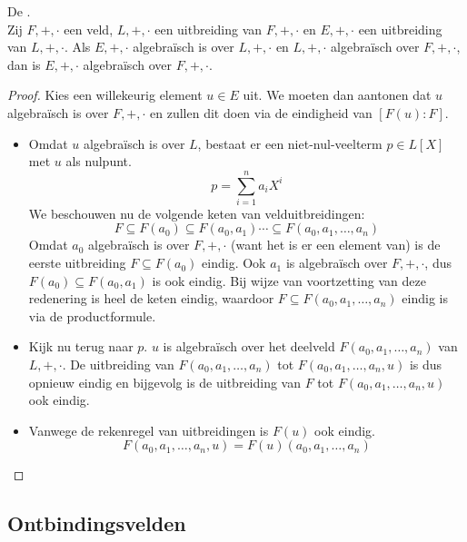 \documentclass[main.tex]{subfiles}
\begin{document}
\begin{st}
  \examen
  \label{st:transitiviteit-algebraisch-zijn}
  De .\\
  Zij $F,+,\cdot$ een veld, $L,+,\cdot$ een uitbreiding van $F,+,\cdot$ en $E,+,\cdot$ een uitbreiding van $L,+,\cdot$.
  Als $E,+,\cdot$ algebra\"isch is over $L,+,\cdot$ en $L,+,\cdot$ algebra\"isch over $F,+,\cdot$, dan is $E,+,\cdot$ algebra\"isch over $F,+,\cdot$.

  \begin{proof}
    Kies een willekeurig element $u\in E$ uit.
    We moeten dan aantonen dat $u$ algebra\"isch is over $F,+,\cdot$ en zullen dit doen via de eindigheid van $[F(u):F]$.
    \begin{itemize}
    \item Omdat $u$ algebra\"isch is over $L$, bestaat er een
      niet-nul-veelterm $p\in L[X]$ met $u$ als nulpunt.
      \[ p = \sum_{i=1}^{n}a_{i}X^{i} \] We beschouwen nu de volgende
      keten van velduitbreidingen:
      \[ F \subseteq F(a_{0}) \subseteq F(a_{0},a_{1}) \dotsb
      \subseteq F(a_{0},a_{1},\dotsc,a_{n}) \] Omdat $a_{0}$
      algebra\"isch is over $F,+,\cdot$ (want het is er een element
      van) is de eerste uitbreiding $F \subseteq F(a_{0})$ eindig.
      Ook $a_{1}$ is algebra\"isch over $F,+,\cdot$, dus $F(a_{0})
      \subseteq F(a_{0},a_{1})$ is ook eindig.  Bij wijze van
      voortzetting van deze redenering is heel de keten eindig,
      waardoor $F \subseteq F(a_{0},a_{1},\dotsc,a_{n})$ eindig is via
      de productformule.
    \item Kijk nu terug naar $p$.
      $u$ is algebra\"isch over het deelveld $F(a_{0},a_{1},\dotsc,a_{n})$ van $L,+,\cdot$.
      De uitbreiding van $F(a_{0},a_{1},\dotsc,a_{n})$ tot $F(a_{0},a_{1},\dotsc,a_{n},u)$ is dus opnieuw eindig en bijgevolg is de uitbreiding van $F$ tot $F(a_{0},a_{1},\dotsc,a_{n},u)$ ook eindig.
    \item Vanwege de rekenregel van uitbreidingen is $F(u)$ ook eindig.
      \[ F(a_{0},a_{1},\dotsc,a_{n},u) = F(u)(a_{0},a_{1},\dotsc,a_{n}) \]
    \end{itemize}
  \end{proof}
\end{st}

\subsection{Ontbindingsvelden}
\label{sec:ontbindingsvelden}
\end{document}
